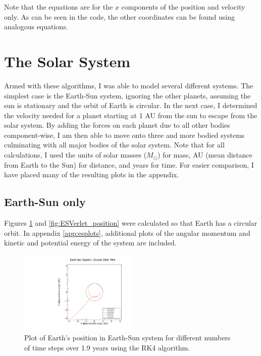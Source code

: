 \documentclass[a4paper,12pt]{report}
\begin{document}
Note that the equations are for the $x$ components of the position and velocity only. As can be seen in the code, the other coordinates can be found using analogous equations.

\section{The Solar System}\label{sec:ss}
Armed with these algorithms, I was able to model several different systems. The simplest case is the Earth-Sun system, ignoring the other planets, assuming the sun is stationary and the orbit of Earth is circular. In the next case, I determined the velocity needed for a planet starting at 1 AU from the sun to escape from the solar system. By adding the forces on each planet due to all other bodies component-wise, I am then able to move onto three and more bodied systems culminating with all major bodies of the solar system. Note that for all calculations, I used the units of solar masses ($M_\odot$) for mass, AU (mean distance from Earth to the Sun) for distance, and years for time. For easier comparison, I have placed many of the resulting plots in the appendix.

\subsection{Earth-Sun only}\label{ssec:esf}
Figures \ref{fig:ESRK4_position} and \ref{fig:ESVerlet_position} were calculated so that Earth has a circular orbit. In appendix \ref{app:esplots}, additional plots of the angular momentum and kinetic and potential energy of the system are included. 

 \begin{figure}
 \centering
   \includegraphics[width=0.5\textwidth]{ESRK4_position.pdf}
  \caption{Plot of Earth's position in Earth-Sun system for different numbers of time steps over 1.9 years using the RK4 algorithm.}
  \label{fig:ESRK4_position}
 \end{figure}
\end{document}
